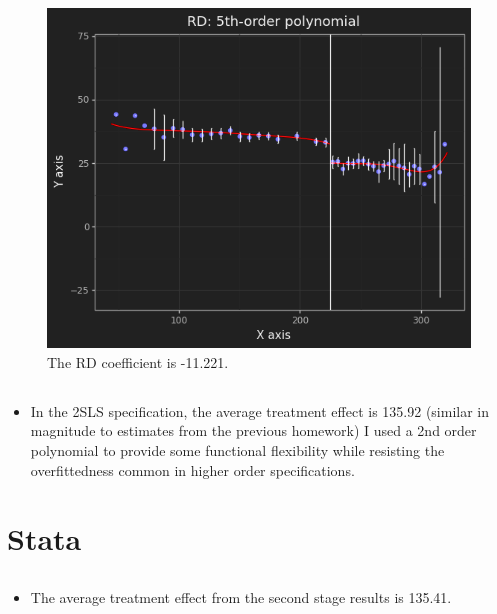 \documentclass{article}
\begin{document}
\clearpage

\subsection{}
\begin{figure}[!h]
    \centering
    \includegraphics[scale=.9]{homework6/output/rdplot3.png}
    \caption{The RD coefficient is -11.221.}
    \label{fig:figure4}
\end{figure}

\subsection{}
\begin{itemize}
    \item In the 2SLS specification, the average treatment effect is 135.92 (similar in magnitude to estimates from the previous homework) I used a 2nd order polynomial to provide some functional flexibility while resisting the overfittedness common in higher order specifications.
\end{itemize}

\clearpage

\section{Stata}
\subsection{}
\begin{itemize}
    \item The average treatment effect from the second stage results is 135.41.
\end{itemize}
\end{document}
